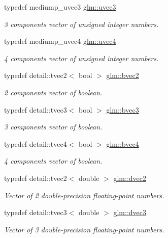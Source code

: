 \begin{DoxyCompactItemize}
typedef mediump\-\_\-uvec3 \hyperlink{group__core__types_ga713379218af0a01d0a7b1e631066106c}{glm\-::uvec3}
\begin{DoxyCompactList}\small\item\em 3 components vector of unsigned integer numbers. \end{DoxyCompactList}\item 
typedef mediump\-\_\-uvec4 \hyperlink{group__core__types_gae85130f09c272fcd64da1353c09dddef}{glm\-::uvec4}
\begin{DoxyCompactList}\small\item\em 4 components vector of unsigned integer numbers. \end{DoxyCompactList}\item 
typedef detail\-::tvec2$<$ bool $>$ \hyperlink{group__core__types_ga0b5729ae4f7b2767a18bb96b7152c072}{glm\-::bvec2}
\begin{DoxyCompactList}\small\item\em 2 components vector of boolean. \end{DoxyCompactList}\item 
typedef detail\-::tvec3$<$ bool $>$ \hyperlink{group__core__types_gac192f5fbd7fcb78ca703d4684f323512}{glm\-::bvec3}
\begin{DoxyCompactList}\small\item\em 3 components vector of boolean. \end{DoxyCompactList}\item 
typedef detail\-::tvec4$<$ bool $>$ \hyperlink{group__core__types_ga8ec34c649bc4513202aff479486bbcea}{glm\-::bvec4}
\begin{DoxyCompactList}\small\item\em 4 components vector of boolean. \end{DoxyCompactList}\item 
typedef detail\-::tvec2$<$ double $>$ \hyperlink{group__core__types_gad9953f484cbb104e8675653ce61900cb}{glm\-::dvec2}
\begin{DoxyCompactList}\small\item\em Vector of 2 double-\/precision floating-\/point numbers. \end{DoxyCompactList}\item 
typedef detail\-::tvec3$<$ double $>$ \hyperlink{group__core__types_ga140a8656fbb8b19382f109c5d5869856}{glm\-::dvec3}
\begin{DoxyCompactList}\small\item\em Vector of 3 double-\/precision floating-\/point numbers. \end{DoxyCompactList}\item 

\end{DoxyCompactItemize}
